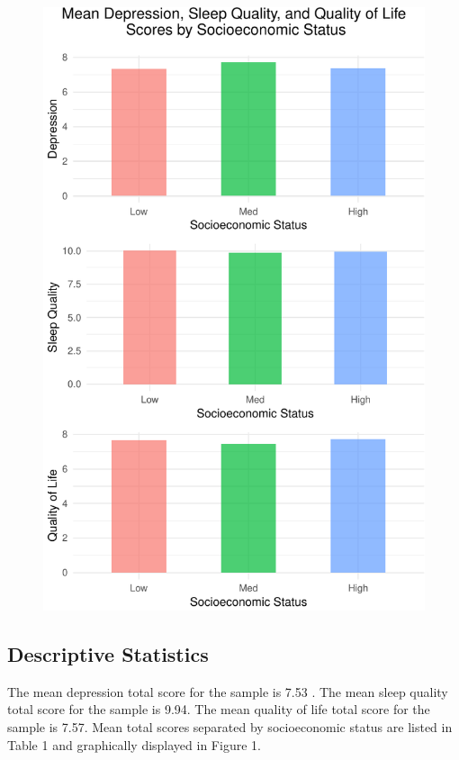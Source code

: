 \documentclass[man, noextraspace]{apa6}
\theoremstyle{definition}
\theoremstyle{definition}
\theoremstyle{definition}
\theoremstyle{remark}
\begin{document}
\begin{figure}
\centering
\includegraphics{APA_Document_files/figure-latex/plot 1-1.pdf}
\caption{}
\end{figure}

\subsection{Descriptive Statistics}\label{descriptive-statistics}

The mean depression total score for the sample is 7.53 . The mean sleep
quality total score for the sample is 9.94. The mean quality of life
total score for the sample is 7.57. Mean total scores separated by
socioeconomic status are listed in Table 1 and graphically displayed in
Figure 1.
\end{document}

